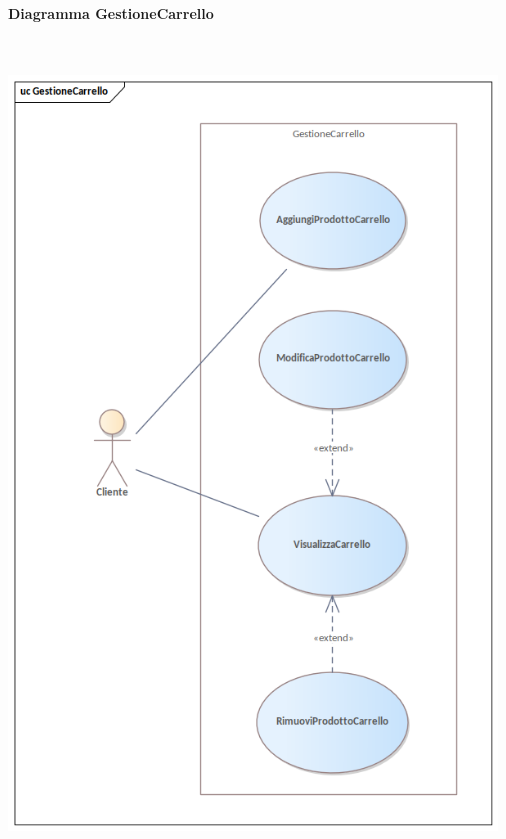 \newpage\paragraph{Diagramma GestioneCarrello}\mbox{}\\
\begin{center}
  \includegraphics[width=\textwidth, height=20cm, keepaspectratio]{immagini/GestioneDeiRequisiti/GestioneCarrello.png}
\end{center}

\newpage
